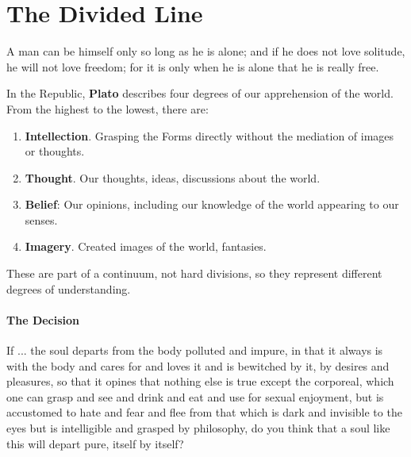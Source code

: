 \section{The Divided Line}

\begin{quotex}
A man can be himself only so long as he is alone; and if he does not love solitude, he will not love freedom; for it is only when he is alone that he is really free.
\end{quotex}


In the Republic, \textbf{Plato} describes four degrees of our apprehension of the world. From the highest to the lowest, there are:

\begin{enumerate}


\item \textbf{Intellection}. Grasping the Forms directly without the mediation of images or thoughts.

\item \textbf{Thought}. Our thoughts, ideas, discussions about the world.

\item \textbf{Belief}: Our opinions, including our knowledge of the world appearing to our senses.

\item \textbf{Imagery}. Created images of the world, fantasies.

\end{enumerate}


These are part of a continuum, not hard divisions, so they represent different degrees of understanding.

\paragraph{The Decision}


\begin{quotex}
If ... the soul departs from the body polluted and impure, in that it always is with the body and cares for and loves it and is bewitched by it, by desires and pleasures, so that it opines that nothing else is true except the corporeal, which one can grasp and see and drink and eat and use for sexual enjoyment, but is accustomed to hate and fear and flee from that which is dark and invisible to the eyes but is intelligible and grasped by philosophy, do you think that a soul like this will depart pure, itself by itself?
\end{quotex}


